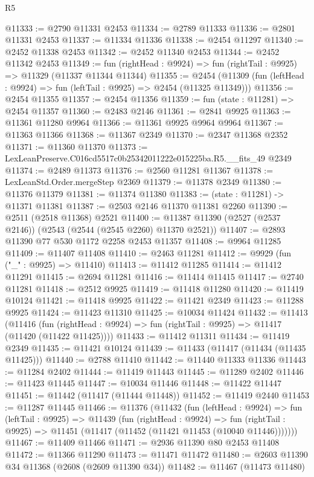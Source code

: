 \begin{lexlean}{R5}
\begin{coremodule}
@11333 := @2790 @11331 @2453
@11334 := @2789 @11333
@11336 := @2801 @11331 @2453
@11337 := @11334 @11336
@11338 := @2454 @11297
@11340 := @2452 @11338 @2453
@11342 := @2452 @11340 @2453
@11344 := @2452 @11342 @2453
@11349 := fun (rightHead : @9924) => fun (rightTail : @9925) => @11329 (@11337 @11344 @11344)
@11355 := @2454 (@11309 (fun (leftHead : @9924) => fun (leftTail : @9925) => @2454 (@11325 @11349)))
@11356 := @2454 @11355
@11357 := @2454 @11356
@11359 := fun (state : @11281) => @2454 @11357
@11360 := @2483 @2146
@11361 := @2841 @9925
@11363 := @11361 @11280 @9964
@11366 := @11361 @9925 @9964 @9964
@11367 := @11363 @11366
@11368 := @11367 @2349
@11370 := @2347 @11368 @2352
@11371 := @11360 @11370
@11373 := LexLeanPreserve.C016cd5517c0b25342011222e015225ba.R5.__fits_49 @2349
@11374 := @2489 @11373
@11376 := @2560 @11281 @11367
@11378 := LexLeanStd.Order.mergeStep @2369
@11379 := @11378 @2349
@11380 := @11376 @11379
@11381 := @11374 @11380
@11383 := (state : @11281) -> @11371 @11381
@11387 := @2503 @2146 @11370 @11381 @2260
@11390 := @2511 (@2518 @11368) @2521
@11400 := @11387 @11390 (@2527 (@2537 @2146)) (@2543 (@2544 (@2545 @2260) @11370 @2521))
@11407 := @2893 @11390 @77 @530 @1172 @2258 @2453 @11357
@11408 := @9964 @11285
@11409 := @11407 @11408
@11410 := @2463 @11281
@11412 := @9929 (fun ("_" : @9925) => @11410)
@11413 := @11412 @11285
@11414 := @11412 @11291
@11415 := @2694 @11281
@11416 := @11414 @11415
@11417 := @2740 @11281
@11418 := @2512 @9925
@11419 := @11418 @11280
@11420 := @11419 @10124
@11421 := @11418 @9925
@11422 := @11421 @2349
@11423 := @11288 @9925
@11424 := @11423 @11310
@11425 := @10034 @11424
@11432 := @11413
    (@11416 (fun (rightHead : @9924) => fun (rightTail : @9925) => @11417 (@11420 (@11422 @11425))))
@11433 := @11412 @11311
@11434 := @11419 @2349
@11435 := @11421 @10124
@11439 := @11433 (@11417 (@11434 (@11435 @11425)))
@11440 := @2788 @11410
@11442 := @11440 @11333 @11336
@11443 := @11284 @2402
@11444 := @11419 @11443
@11445 := @11289 @2402
@11446 := @11423 @11445
@11447 := @10034 @11446
@11448 := @11422 @11447
@11451 := @11442 (@11417 (@11444 @11448))
@11452 := @11419 @2440
@11453 := @11287 @11445
@11466 := @11376
    (@11432
      (fun (leftHead : @9924) =>
      fun (leftTail : @9925) =>
      @11439
        (fun (rightHead : @9924) =>
        fun (rightTail : @9925) => @11451 (@11417 (@11452 (@11421 @11453 (@10040 @11446)))))))
@11467 := @11409 @11466
@11471 := @2936 @11390 @80 @2453 @11408
@11472 := @11366 @11290
@11473 := @11471 @11472
@11480 := @2603 @11390 @34 @11368 (@2608 (@2609 @11390 @34))
@11482 := @11467 (@11473 @11480)

\end{coremodule}
\end{lexlean}
